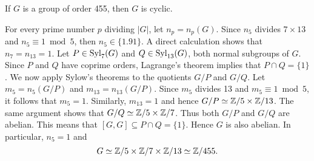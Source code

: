 \begin{example}
If $G$ is a group of order 455, then $G$ is cyclic.

For every prime number $p$ dividing $|G|$, let $n_p=n_p(G)$. 
Since $n_5$ divides $7\times 13$ and
$n_5\equiv 1\bmod 5$, then $n_5\in\{1.91\}$. A direct 
calculation shows that $n_7=n_{13}=1$. Let $P\in\mathrm{Syl}_7(G)$ and  $Q\in\mathrm{Syl}_{13}(G)$, both normal subgroups of $G$. Since $P$ and $Q$ 
have coprime orders, Lagrange's theorem implies that 
$P\cap Q=\{1\}$.
We now apply Sylow's theorems to the quotients $G/P$ and $G/Q$.
Let $m_5=n_5(G/P)$ and $m_{13}=n_{13}(G/P)$. Since $m_5$ divides 13 and  $m_5\equiv1\bmod 5$, it follows that 
$m_5=1$. Similarly, $m_{13}=1$ and
hence $G/P\simeq\mathbb{Z}/5\times\mathbb{Z}/13$. The same argument shows that 
$G/Q\simeq\mathbb{Z}/5\times\mathbb{Z}/7$. Thus both $G/P$ and $G/Q$ are abelian. 
This means that 
$[G,G]\subseteq P\cap Q=\{1\}$. Hence $G$ is also abelian. 
In particular, $n_5=1$ and 
\[
G\simeq\mathbb{Z}/5\times\mathbb{Z}/7\times\mathbb{Z}/13\simeq\mathbb{Z}/455.
\]
\end{example}


